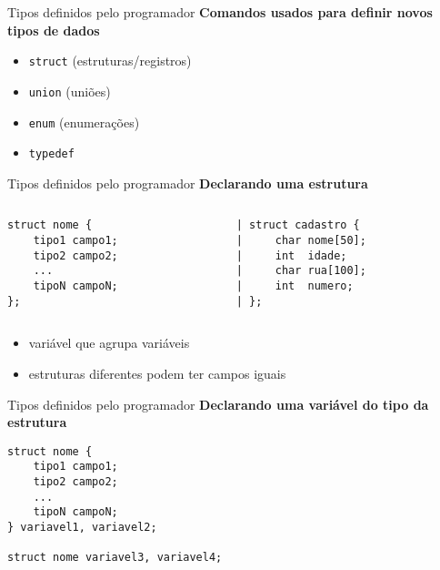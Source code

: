 \documentclass[10pt]{beamer}
\begin{document}
\begin{frame}{Tipos definidos pelo programador}
    \huge \textbf{Comandos usados para definir novos tipos de dados}

    \begin{itemize}
        \item \texttt{struct} (estruturas/registros)
        \item \texttt{union} (uniões)
        \item \texttt{enum} (enumerações)
        \item \texttt{typedef}
    \end{itemize}
\end{frame}

\begin{frame}[fragile]{Tipos definidos pelo programador}
    \huge
    \textbf{Declarando uma estrutura}

    \bigskip

    \large
    \begin{columns}
    \begin{column}{0.35\textwidth}
        \begin{verbatim}
struct nome {
    tipo1 campo1;
    tipo2 campo2;
    ...
    tipoN campoN;
};
        \end{verbatim}
    \end{column}
    \begin{column}{0.55\textwidth}
        \begin{verbatim}
| struct cadastro {
|     char nome[50];
|     int  idade;
|     char rua[100];
|     int  numero;
| };
        \end{verbatim}
    \end{column}
    \end{columns}

    \vfill

    \setlength{\leftmargini}{0pt}
    \begin{itemize}
        \item [] variável que agrupa variáveis
        \item [] estruturas diferentes podem ter campos iguais
    \end{itemize}
\end{frame}

\begin{frame}[fragile]{Tipos definidos pelo programador}
    \huge
    \textbf{Declarando uma variável do tipo da estrutura}

    \bigskip

    \large
    \begin{verbatim}
struct nome {
    tipo1 campo1;
    tipo2 campo2;
    ...
    tipoN campoN;
} variavel1, variavel2;

struct nome variavel3, variavel4;
    \end{verbatim}

\end{frame}
\end{document}
